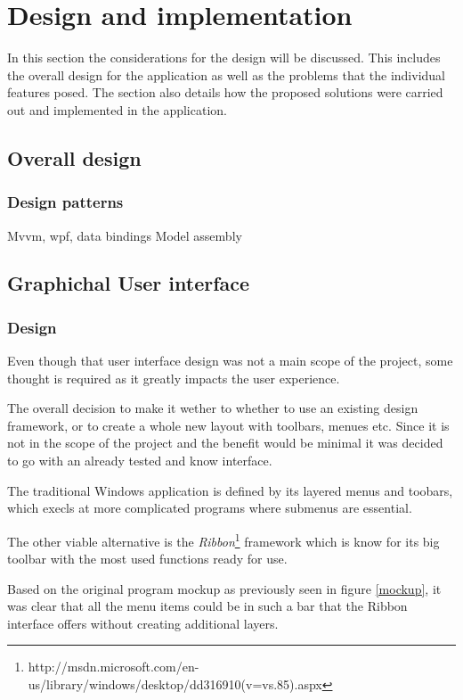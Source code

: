 \section{Design and implementation}
In this section the considerations for the design will be discussed. This
includes the overall design for the application as well as the problems that the
individual features posed. The section also details how the proposed solutions
were carried out and implemented in the application.

\subsection{Overall design}
\subsubsection{Design patterns}
Mvvm, wpf, data bindings
Model assembly


\subsection{Graphichal User interface}
\subsubsection{Design}
Even though that user interface design was not a main scope of the project, some
thought is required as it greatly impacts the user experience. 

The overall decision to make it wether to whether to use an existing design
framework, or to create a whole new layout with toolbars, menues etc. Since it
is not in the scope of the project and the benefit would be minimal it was decided
to go with an already tested and know interface. 

The traditional Windows application is defined by its layered menus and
toobars,
which execls at more complicated programs where submenus are essential.

The other viable alternative is the \textit{Ribbon}\footnote{http://msdn.microsoft.com/en-us/library/windows/desktop/dd316910(v=vs.85).aspx} framework which is know for
its big toolbar with the most used functions ready for use.

Based on the original program mockup as previously seen in figure \ref{mockup},
it was clear that all the menu items could be in such a bar that the Ribbon
interface offers without creating additional layers.

